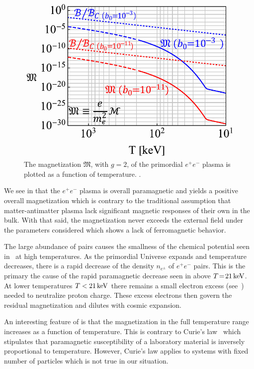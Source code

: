\begin{figure}
 \centering
 \hspace*{0.4cm}\includegraphics[width=0.8\linewidth]{plots/thesis_mag.pdf}
 \caption{The magnetization ${\mathfrak M}$, with $g\!=\!2$, of the primordial $e^{+}e^{-}$ plasma is plotted as a function of temperature. . }
 \label{fig:magnet} 
\end{figure}

We see in  that the $e^{+}e^{-}$ plasma is overall paramagnetic and yields a positive overall magnetization which is contrary to the traditional assumption that matter-antimatter plasma lack significant magnetic responses of their own in the bulk. With that said, the magnetization never exceeds the external field under the parameters considered which shows a lack of ferromagnetic behavior. 

The large abundance of pairs causes the smallness of the chemical potential seen in~ at high temperatures. As the primordial Universe expands and temperature decreases, there is a rapid decrease of the density $n_{e^{\pm}}$ of $e^{+}e^{-}$ pairs. This is the primary the cause of the rapid paramagnetic decrease seen in  above $T\!=\!21\text{\,keV}$. At lower temperatures $T<21\text{\,keV}$ there remains a small electron excess (see~) needed to neutralize proton charge. These excess electrons then govern the residual magnetization and dilutes with cosmic expansion.

An interesting feature of  is that the magnetization in the full temperature range increases as a function of temperature. This is contrary to Curie's law~\cite{greiner2012thermodynamics} which stipulates that paramagnetic susceptibility of a laboratory material is inversely proportional to temperature. However, Curie's law applies to systems with fixed number of particles which is not true in our situation.

